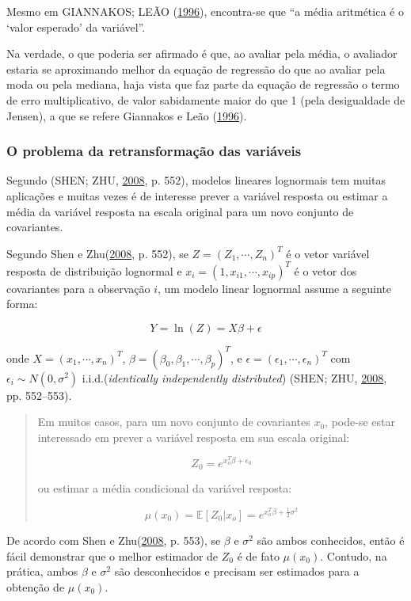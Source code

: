 \documentclass[a4paper, 12pt]{article}
\begin{document}
Mesmo em GIANNAKOS; LEÃO (\protect\hyperlink{ref-giannakos}{1996}),
encontra-se que ``a média aritmética é o `valor esperado' da variável''.

Na verdade, o que poderia ser afirmado é que, ao avaliar pela média, o
avaliador estaria se aproximando melhor da equação de regressão do que
ao avaliar pela moda ou pela mediana, haja vista que faz parte da
equação de regressão o termo de erro multiplicativo, de valor
sabidamente maior do que 1 (pela desigualdade de Jensen), a que se
refere Giannakos e Leão (\protect\hyperlink{ref-giannakos}{1996}).

\subsubsection{O problema da retransformação das
variáveis}\label{o-problema-da-retransformacao-das-variaveis}

Segundo (SHEN; ZHU, \protect\hyperlink{ref-shen}{2008}, p. 552), modelos
lineares lognormais tem muitas aplicações e muitas vezes é de interesse
prever a variável resposta ou estimar a média da variável resposta na
escala original para um novo conjunto de covariantes.

Segundo Shen e Zhu(\protect\hyperlink{ref-shen}{2008}, p. 552), se
\(Z = (Z_1,\cdots, Z_n)^T\) é o vetor variável resposta de distribuição
lognormal e \(x_i = (1, x_{i1}, \cdots, x_{ip})^T\) é o vetor dos
covariantes para a observação \(i\), um modelo linear lognormal assume a
seguinte forma:

\[Y = \ln(Z) = X\beta + \epsilon\]

onde \(X = (x_1, \cdots, x_n)^T\),
\(\beta = (\beta_0, \beta_1, \cdots, \beta_p)^T\), e
\(\epsilon = (\epsilon_1, \cdots, \epsilon_n)^T\) com
\(\epsilon_i \sim N(0, \sigma^2)\) i.i.d.(\emph{identically
independently distributed}) (SHEN; ZHU,
\protect\hyperlink{ref-shen}{2008}, pp. 552--553).

\begin{quote}
Em muitos casos, para um novo conjunto de covariantes \(x_0\), pode-se
estar interessado em prever a variável resposta em sua escala original:

\[Z_0 = e^{x_o^T\beta + \epsilon_0}\]

ou estimar a média condicional da variável resposta:

\[\mu(x_0)=\mathbb{E}[Z_0|x_o] = e^{x_o^T\beta + \frac{1}{2}\sigma^2}\]
\end{quote}

De acordo com Shen e Zhu(\protect\hyperlink{ref-shen}{2008}, p. 553), se
\(\beta\) e \(\sigma^2\) são ambos conhecidos, então é fácil demonstrar
que o melhor estimador de \(Z_0\) é de fato \(\mu(x_0)\). Contudo, na
prática, ambos \(\beta\) e \(\sigma^2\) são desconhecidos e precisam ser
estimados para a obtenção de \(\mu(x_0)\).
\end{document}
